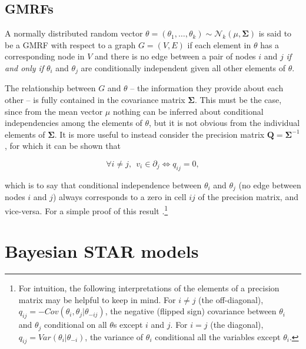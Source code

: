 \subsection{GMRFs}
A normally distributed random vector $\theta = (\theta_1, \dots, \theta_k) \sim \mathcal{N}_k (\mu, \boldsymbol{\Sigma})$ is said to be a GMRF with respect to a graph $G = (V,E)$ if each element in $\theta$ has a corresponding node in $V$ and there is no edge between a pair of nodes $i$ and $j$ \emph{if and only if} $\theta_i$ and $\theta_j$ are conditionally independent given all other elements of $\theta$. 


The relationship between $G$ and $\theta$ -- the information they provide about each other -- is fully contained in the covariance matrix $\boldsymbol{\Sigma}$.  This must be the case, since from the mean vector $\mu$ nothing can be inferred about conditional independencies among the elements of $\theta$, but it is not obvious from the individual elements of $\boldsymbol{\Sigma}$. It is more useful to instead consider the precision matrix $\boldsymbol{Q}=\boldsymbol{\Sigma}^{-1}$, for which it can be shown that

\begin{equation*}
\forall i \neq j, \:\: v_i \in \partial_j \iff q_{ij} = 0,
\end{equation*}

\noindent which is to say that conditional independence between $\theta_i$ and $\theta_j$ (no edge between nodes $i$ and $j$) always corresponds to a zero in cell $ij$ of the precision matrix, and vice-versa.  For a simple proof of this result .\footnote{For intuition, the following interpretations of the elements of a precision matrix may be helpful to keep in mind. For $i \neq j$ (the off-diagonal), $q_{ij}  = -Cov(\theta_i, \theta_j | \theta_{-ij}) $, the negative (flipped sign) covariance between $\theta_i$ and $\theta_j$ conditional on all $\theta$s except $i$ and $j$.  For $i = j$ (the diagonal),  $q_{ij} = Var(\theta_i | \theta_{-i})$, the variance of $\theta_i$ conditional all the variables except $\theta_i$.}






\section{Bayesian STAR models}

